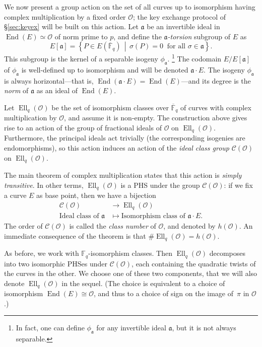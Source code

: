 \documentclass{llncs}
\newcommand{\F}{\mathbb{F}}
\newcommand{\Fbar}{\overline{\mathbb{F}}}
\newcommand{\Cl}{\mathcal{C}}
\renewcommand{\O}{\mathcal{O}}
\newcommand{\set}[1]{\left\{#1\right\}}
\newcommand{\suchthat}{\,\middle\vert\,}
\renewcommand{\frak}{\mathfrak}
\DeclareMathOperator{\End}{End}
\DeclareMathOperator{\Ell}{Ell}
\begin{document}
We now present a group action on the set of all curves 
up to isomorphism having complex
multiplication by a fixed order $\O$; the key exchange protocol of
\S\ref{sec:keyex} will be built on this action. Let $\frak a$ be
an invertible ideal in $\End(E)≃\O$ of norm prime to $p$, and define the
\emph{${\frak a}$-torsion} subgroup of $E$ as
\[
E[\frak a] = \set{P\in E(\Fbar_q) \suchthat σ(P) = 0\ 
\text{ for all }σ\in\frak a}.
\]
This subgroup is the kernel of a separable isogeny $\phi_{\frak a}$. \footnote{In fact, one can define $\phi_{\frak a}$ for any invertible ideal $\frak a$, but it is not always separable.}
The codomain $E/E[\frak a]$ of $\phi_{\frak a}$ is well-defined up to isomorphism
and will be denoted $\frak a\cdot E$.
The isogeny $\phi_{\frak a}$ is
always horizontal---that is, $\End(\frak a \cdot E) = \End(E)$---and its
degree is the \emph{norm} of $\frak a$ as an ideal of $\End(E)$.

Let $\Ell_q(\O)$ be the set of isomorphism classes over $\Fbar_q$
of curves with complex multiplication by $\O$, and assume it is non-empty. 
The construction above gives rise
to an action of the group of fractional ideals of $\O$ on $\Ell_q(\O)$.
Furthermore, the principal ideals act trivially 
(the corresponding isogenies are endomorphisms), 
so this action induces an action of the \emph{ideal
class group} $\Cl(\O)$ on $\Ell_q(\O)$.

The main theorem of complex
multiplication states that this action is \emph{simply transitive}. In
other terms, $\Ell_q(\O)$ is a PHS
under the group $\Cl(\O)$: if we fix a curve $E$ as base point,
then we have a bijection
\[
\begin{aligned}
\Cl(\O) &\longrightarrow \Ell_q(\O) \\
\text{Ideal class of }\frak a &\longmapsto \text{Isomorphism class of }\frak a\cdot E.
\end{aligned}
\]
The order of $\Cl(\O)$ is called the \emph{class number} of $\O$, and
denoted by $h(\O)$. An immediate consequence of the theorem is that
$\#\Ell_q(\O)=h(\O)$.

As before, we work with $\F_q$-isomorphism classes.
Then $\Ell_q(\O)$ decomposes into two isomorphic PHSes under $\Cl(\O)$,
each containing the quadratic twists of the curves in the other. 
We choose one of these
two components, that we will also denote $\Ell_q(\O)$ in the sequel.
(The choice is equivalent to a choice of isomorphism $\End(E) \cong \O$,
and thus to a choice of sign on the image of~\(\pi\) in $\O$.)
\end{document}
